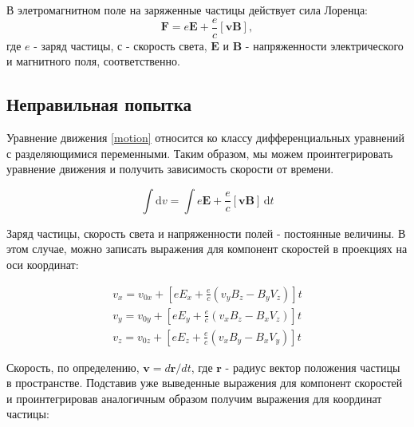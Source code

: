 \documentclass[a4paper]{article}
\begin{document}
В элетромагнитном поле на заряженные частицы действует сила Лоренца:
\begin{equation}\label{lorenz}
\mathbf{F} = e \mathbf{E} + \frac{e}{c}\left[\mathbf{vB}\right],
\end{equation}
где $e$ - заряд частицы, $с$ - скорость света, $\mathbf{E}$ и $\mathbf{B}$ - напряженности электрического и магнитного поля, соответственно.

\subsection{Неправильная попытка}
Уравнение движения \eqref{motion} относится ко классу дифференциальных уравнений с разделяющимися переменными. Таким образом, мы можем проинтегрировать уравнение движения и получить зависимость скорости от времени.

\begin{equation}\label{intmotion}
\int \mathrm{d}v =\int e \mathbf{E} + \frac{e}{c}\left[\mathbf{vB}\right] \, \mathrm{d}t
\end{equation}

Заряд частицы, скорость света и напряженности полей - постоянные величины. В этом случае, можно записать выражения для компонент скоростей в проекциях на оси координат:

\begin{equation}\label{velocity_components}
\begin{aligned}
v_x = v_{0x} + \left[ e E_x + \frac{e}{c} \left( v_y B_z - B_y V_z \right) \right] t \\
v_y = v_{0y} + \left[ e E_y + \frac{e}{c} \left( v_x B_z - B_x V_z \right) \right] t \\
v_z = v_{0z} + \left[ e E_z + \frac{e}{c} \left( v_x B_y - B_x V_y \right) \right] t
\end{aligned}
\end{equation}

Скорость, по определению, $\mathbf{v} = d\mathbf{r}/dt$, где $\mathbf{r}$ - радиус вектор положения частицы в пространстве. Подставив уже выведенные выражения для компонент скоростей и проинтегрировав аналогичным образом получим выражения для координат частицы:
\end{document}
